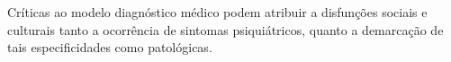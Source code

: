 Críticas ao modelo diagnóstico médico podem atribuir a disfunções sociais e culturais tanto a ocorrência de sintomas psiquiátricos, quanto a demarcação de tais especificidades como patológicas.